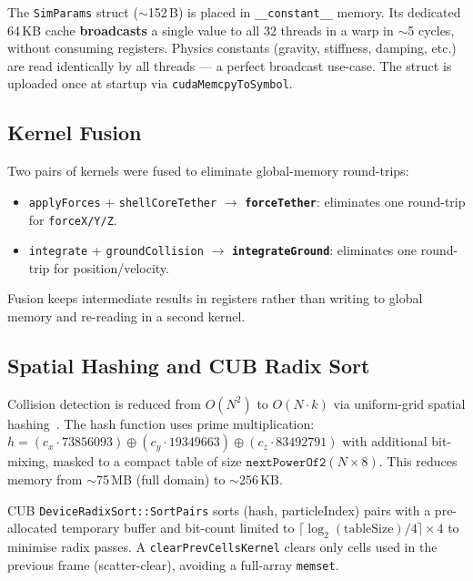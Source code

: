 The \texttt{SimParams} struct ($\sim$152\,B) is placed in
\texttt{\_\_constant\_\_} memory. Its dedicated 64\,KB cache \textbf{broadcasts}
a single value to all 32 threads in a warp in $\sim$5 cycles, without consuming
registers. Physics constants (gravity, stiffness, damping, etc.) are read
identically by all threads --- a perfect broadcast use-case. The struct is
uploaded once at startup via \texttt{cudaMemcpyToSymbol}.

\subsection{Kernel Fusion}
\label{sec:fusion}

Two pairs of kernels were fused to eliminate global-memory round-trips:

\begin{itemize}
  \item \texttt{applyForces} + \texttt{shellCoreTether} $\to$
        \textbf{\texttt{forceTether}}: eliminates one round-trip for
        \texttt{forceX/Y/Z}.
  \item \texttt{integrate} + \texttt{groundCollision} $\to$
        \textbf{\texttt{integrateGround}}: eliminates one round-trip for
        position/velocity.
\end{itemize}

Fusion keeps intermediate results in registers rather than writing to global
memory and re-reading in a second kernel.

\subsection{Spatial Hashing and CUB Radix Sort}
\label{sec:spatial_hash}

Collision detection is reduced from $O(N^2)$ to $O(N \cdot k)$ via
uniform-grid spatial hashing~\cite{teschner2003}. The hash function uses
prime multiplication: $h = (c_x \cdot 73856093) \oplus (c_y \cdot 19349663)
\oplus (c_z \cdot 83492791)$ with additional bit-mixing, masked to a compact
table of size $\texttt{nextPowerOf2}(N \times 8)$. This reduces memory from
$\sim$75\,MB (full domain) to $\sim$256\,KB.

CUB \texttt{DeviceRadixSort::SortPairs} sorts (hash, particleIndex) pairs with
a pre-allocated temporary buffer and bit-count limited to
$\lceil\log_2(\text{tableSize})/4\rceil \times 4$ to minimise radix passes.
A \texttt{clearPrevCellsKernel} clears only cells used in the previous frame
(scatter-clear), avoiding a full-array \texttt{memset}.

